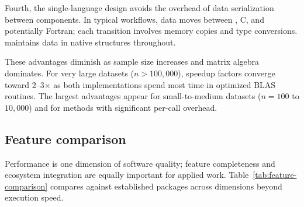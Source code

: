 Fourth, the single-language design avoids the overhead of data serialization
between components. In typical  workflows, data moves between
, C, and potentially Fortran; each transition involves memory
copies and type conversions.  maintains data in native
 structures throughout.

These advantages diminish as sample size increases and matrix algebra dominates.
For very large datasets ($n > 100{,}000$), speedup factors converge toward
2--3$\times$ as both implementations spend most time in optimized BLAS routines.
The largest advantages appear for small-to-medium datasets ($n = 100$ to $10{,}000$)
and for methods with significant per-call overhead.

\subsection{Feature comparison}

Performance is one dimension of software quality; feature completeness and
ecosystem integration are equally important for applied work. Table~\ref{tab:feature-comparison}
compares  against established  packages across
dimensions beyond execution speed.

